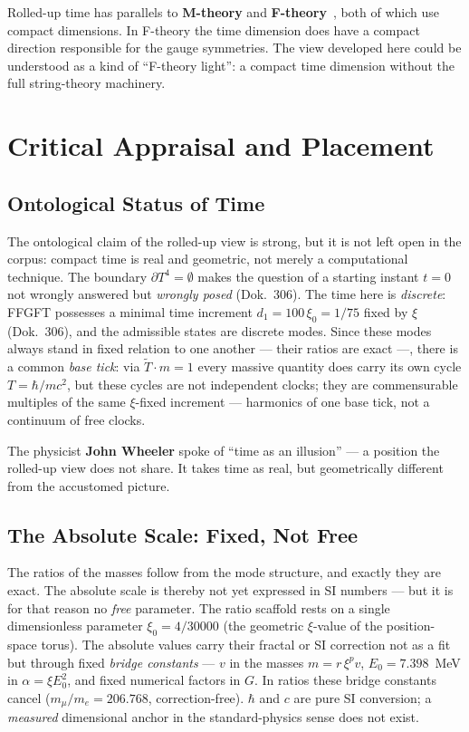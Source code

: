 \documentclass[11pt,a4paper]{article}
\begin{document}
Rolled-up time has parallels to \textbf{M-theory} and \textbf{F-theory}~\cite{Vafa1996}, both of which use compact dimensions. In F-theory the time dimension does have a compact direction responsible for the gauge symmetries. The view developed here could be understood as a kind of ``F-theory light'': a compact time dimension without the full string-theory machinery.

\section{Critical Appraisal and Placement}

\subsection{Ontological Status of Time}

The ontological claim of the rolled-up view is strong, but it is not left open in the corpus: compact time is real and geometric, not merely a computational technique. The boundary $\partial T^4 = \emptyset$ makes the question of a starting instant $t=0$ not wrongly answered but \emph{wrongly posed} (Dok.~306). The time here is \emph{discrete}: FFGFT possesses a minimal time increment $d_1 = 100\,\xi_0 = 1/75$ fixed by $\xi$ (Dok.~306), and the admissible states are discrete modes. Since these modes always stand in fixed relation to one another --- their ratios are exact ---, there is a common \emph{base tick}: via $\tilde T\cdot m = 1$ every massive quantity does carry its own cycle $T=\hbar/mc^2$, but these cycles are not independent clocks; they are commensurable multiples of the same $\xi$-fixed increment --- harmonics of one base tick, not a continuum of free clocks.

The physicist \textbf{John Wheeler} spoke of ``time as an illusion'' --- a position the rolled-up view does not share. It takes time as real, but geometrically different from the accustomed picture.

\subsection{The Absolute Scale: Fixed, Not Free}

The ratios of the masses follow from the mode structure, and exactly they are exact. The absolute scale is thereby not yet expressed in SI numbers --- but it is for that reason no \emph{free} parameter. The ratio scaffold rests on a single dimensionless parameter $\xi_0 = 4/30000$ (the geometric $\xi$-value of the position-space torus). The absolute values carry their fractal or SI correction not as a fit but through fixed \emph{bridge constants} --- $v$ in the masses $m = r\,\xi^{p} v$, $E_0 = 7.398$~MeV in $\alpha = \xi E_0^2$, and fixed numerical factors in $G$. In ratios these bridge constants cancel ($m_\mu/m_e = 206.768$, correction-free). $\hbar$ and $c$ are pure SI conversion; a \emph{measured} dimensional anchor in the standard-physics sense does not exist.
\end{document}
